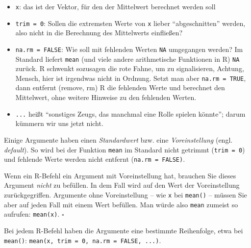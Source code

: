 \documentclass[
  letterpaper,
]{scrbook}
\providecommand{\tightlist}{%
  \setlength{\itemsep}{0pt}\setlength{\parskip}{0pt}}\usepackage{longtable,booktabs,array}
\theoremstyle{definition}
\theoremstyle{definition}
\theoremstyle{definition}
\theoremstyle{remark}
\begin{document}
\begin{itemize}
\tightlist
\item
  \texttt{x}: das ist der Vektor, für den der Mittelwert berechnet
  werden soll
\item
  \texttt{trim\ =\ 0}: Sollen die extremsten Werte von \texttt{x} lieber
  ``abgeschnitten'' werden, also nicht in die Berechnung des Mittelwerts
  einfließen?
\item
  \texttt{na.rm\ =\ FALSE}: Wie soll mit fehlenden Werten \texttt{NA}
  umgegangen werden? Im Standard liefert \texttt{mean} (und viele andere
  arithmetische Funktionen in R) \texttt{NA} zurück. R schwenkt
  sozusagen die rote Fahne, um zu signalisieren, Achtung, Mensch, hier
  ist irgendwas nicht in Ordnung. Setzt man aber
  \texttt{na.rm\ =\ TRUE}, dann entfernt (remove, rm) R die fehlenden
  Werte und berechnet den Mittelwert, ohne weitere Hinweise zu den
  fehlenden Werten.
\item
  \texttt{...} heißt ``sonstiges Zeugs, das manchmal eine Rolle spielen
  könnte''; darum kümmern wir uns jetzt nicht.
\end{itemize}

Einige Argumente haben einen \emph{Standardwert} bzw. eine
\emph{Voreinstellung} (engl. \emph{default}). So wird bei der Funktion
\texttt{mean} im Standard nicht getrimmt (\texttt{trim\ =\ 0}) und
fehlende Werte werden nicht entfernt (\texttt{na.rm\ =\ FALSE)}.

\begin{tcolorbox}[enhanced jigsaw, left=2mm, toptitle=1mm, toprule=.15mm, rightrule=.15mm, leftrule=.75mm, breakable, colbacktitle=quarto-callout-note-color!10!white, colback=white, coltitle=black, bottomtitle=1mm, opacityback=0, title=\textcolor{quarto-callout-note-color}{\faInfo}\hspace{0.5em}{Hinweis}, colframe=quarto-callout-note-color-frame, arc=.35mm, opacitybacktitle=0.6, bottomrule=.15mm, titlerule=0mm]

Wenn ein R-Befehl ein Argument mit Voreinstellung hat, brauchen Sie
dieses Argument \emph{nicht} zu befüllen. In dem Fall wird auf den Wert
der Voreinstellung zurückgegriffen. Argumente ohne Voreinstellung -- wie
\texttt{x} bei \texttt{mean()} -- müssen Sie aber auf jeden Fall mit
einem Wert befüllen. Man würde also \texttt{mean} zumeist so aufrufen:
\texttt{mean(x)}. \(\square\)

\end{tcolorbox}

Bei jedem R-Befehl haben die Argumente eine bestimmte Reihenfolge, etwa
bei \texttt{mean()}:
\texttt{mean(x,\ trim\ =\ 0,\ na.rm\ =\ FALSE,\ ...)}.
\end{document}
